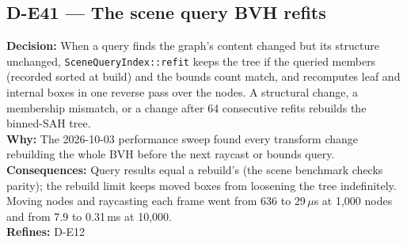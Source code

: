 \subsection*{D-E41 --- The scene query BVH refits}
\begin{decisionbox}[title={D-E41 \quad 2026-10-03}]
\textbf{Decision:} When a query finds the graph's content changed but its
structure unchanged, \texttt{SceneQueryIndex::refit} keeps the tree if the
queried members (recorded sorted at build) and the bounds count match, and
recomputes leaf and internal boxes in one reverse pass over the nodes. A
structural change, a membership mismatch, or a change after 64 consecutive
refits rebuilds the binned-SAH tree.\\
\textbf{Why:} The 2026-10-03 performance sweep found every transform change
rebuilding the whole BVH before the next raycast or bounds query.\\
\textbf{Consequences:} Query results equal a rebuild's (the scene benchmark
checks parity); the rebuild limit keeps moved boxes from loosening the tree
indefinitely. Moving nodes and raycasting each frame went from 636 to
29\,$\mu$s at 1,000 nodes and from 7.9 to 0.31\,ms at 10,000.\\
\textbf{Refines:} D-E12
\end{decisionbox}

